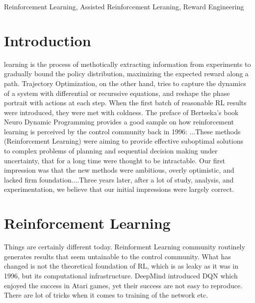 \documentclass[journal]{IEEEtran}
\begin{document}
\begin{IEEEkeywords}
Reinforcement Learning, Assisted Reinforcement Leraning, Reward Engineering
\end{IEEEkeywords}
%
\IEEEpeerreviewmaketitle


\section{Introduction}
 learning is the process of methotically extracting information from experiments to gradually bound the policy distribution, maximizing the expected reward along a path. Trajectory Optimization, on the other hand, tries to capture the dynamics of a system with differential or recurssive equations, and reshape the phase portrait with actions at each step. When the first batch of reasonable RL results were introduced, they were met with coldness. The preface of Bertseka's book Neuro Dynamic Programming provides a good sample on how reinforcement learning is perceived by the control community back in 1996: ...These methods (Reinforcement Learning) were aiming to provide effective suboptimal solutions to complex problems of planning and sequential decision making under uncertainty, that for a long time were thought to be intractable. Our first impression was that the new methods were ambitious, overly optimistic, and lacked firm foundation....Three years later, after a lot of study, analysis, and experimentation, we believe that our initial impressions were largely correct. \cite{Bertsekas1996NeuroDynamicP}

\section{Reinforcement Learning}
Things are certainly different today. Reinforment Learning community routinely generates results that seem untainable to the control community. What has changed is not the theoretical foundation of RL, which is as leaky as it was in 1996, but its computational infrastructure. DeepMind introduced DQN which enjoyed the success in Atari games, yet their success are not easy to reproduce. There are lot of tricks when it comes to training of the network etc.
\end{document}
